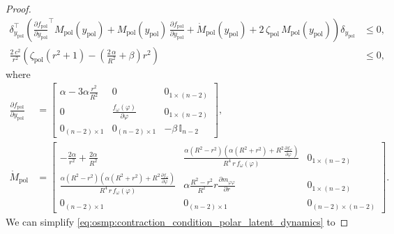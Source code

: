 \begin{proof}
    \begin{equation}\label{eq:osmp:contraction_condition_polar_latent_dynamics}
    \begin{split}
        \delta_{y_\mathrm{pol}}^\top \left ( \frac{\partial f_\mathrm{pol}}{\partial y_\mathrm{pol}}^\top M_\mathrm{pol}(y_\mathrm{pol}) + M_\mathrm{pol}(y_\mathrm{pol}) \, \frac{\partial f_\mathrm{pol}}{\partial y_\mathrm{pol}} + \dot{M}_\mathrm{pol}(y_\mathrm{pol}) + 2 \, \zeta_\mathrm{pol} \, M_\mathrm{pol}(y_\mathrm{pol}) \right ) \delta_{y_\mathrm{pol}} &\leq 0,\\
        \frac{2 \, c^2}{r^2} \left (\zeta_\mathrm{pol} \left ( r^2 + 1 \right ) - \left ( \frac{2 \, \alpha}{R^2} + \beta \right ) r^2 \right ) & \leq 0,
    \end{split}
    \end{equation}
    where
    \begin{equation}
    \begin{split}
        \frac{\partial f_\mathrm{pol}}{\partial y_\mathrm{pol}} &= \begin{bmatrix}
            \alpha - 3 \alpha \frac{r^2}{R^2} & 0 & 0_{1 \times (n-2)}\\
            0 & \frac{f_\omega(\varphi)}{\partial \varphi} & 0_{1 \times (n-2)}\\
            0_{(n-2) \times 1} & 0_{(n-2) \times 1} & -\beta \, \mathbb{I}_{n-2}
        \end{bmatrix},\\
        \dot{M}_\mathrm{pol} &= \begin{bmatrix}
            -\frac{2 \alpha}{r^2} + \frac{2 \alpha}{R^2} & \frac{\alpha \left ( R^2-r^2 \right ) \left ( \alpha(R^2+r^2) + R^2 \frac{\partial f_\omega}{\partial \varphi} \right )}{R^4 \, r \,  f_\omega(\varphi)} & 0_{1 \times (n-2)}\\
           \frac{\alpha \left ( R^2-r^2 \right ) \left ( \alpha(R^2+r^2) + R^2 \frac{\partial f_\omega}{\partial \varphi} \right )}{R^4 \, r \,  f_\omega(\varphi)} & \alpha \frac{R^2-r^2}{R^2} r \frac{\partial m_{\varphi \varphi}}{\partial r} & 0_{1 \times (n-2)}\\
            0_{(n-2) \times 1} & 0_{(n-2) \times 1} & 0_{(n-2) \times (n-2)}
        \end{bmatrix}.
     \end{split}
    \end{equation}
    We can simplify \eqref{eq:osmp:contraction_condition_polar_latent_dynamics} to

\end{proof}
